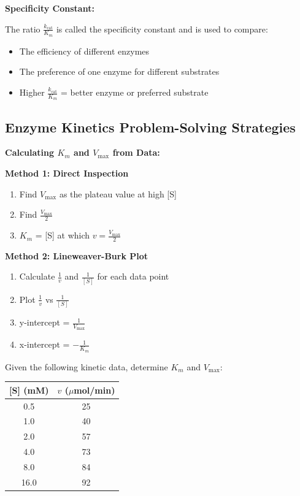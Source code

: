 \begin{theorem}
\textbf{Specificity Constant:}

The ratio $\frac{k_{\text{cat}}}{K_m}$ is called the specificity constant and is used to compare:
\begin{itemize}
    \item The efficiency of different enzymes
    \item The preference of one enzyme for different substrates
    \item Higher $\frac{k_{\text{cat}}}{K_m}$ = better enzyme or preferred substrate
\end{itemize}
\end{theorem}

\subsection{Enzyme Kinetics Problem-Solving Strategies}

\begin{skillbox}
\textbf{Calculating $K_m$ and $V_{\max}$ from Data:}

\textbf{Method 1: Direct Inspection}
\begin{enumerate}
    \item Find $V_{\max}$ as the plateau value at high [S]
    \item Find $\frac{V_{\max}}{2}$
    \item $K_m$ = [S] at which $v = \frac{V_{\max}}{2}$
\end{enumerate}

\textbf{Method 2: Lineweaver-Burk Plot}
\begin{enumerate}
    \item Calculate $\frac{1}{v}$ and $\frac{1}{[S]}$ for each data point
    \item Plot $\frac{1}{v}$ vs $\frac{1}{[S]}$
    \item y-intercept = $\frac{1}{V_{\max}}$
    \item x-intercept = $-\frac{1}{K_m}$
\end{enumerate}
\end{skillbox}

\begin{example}
Given the following kinetic data, determine $K_m$ and $V_{\max}$:

\begin{center}
\begin{tabular}{cc}
\toprule
{[S] (mM)} & $v$ ($\mu$mol/min) \\
\midrule
0.5 & 25 \\
1.0 & 40 \\
2.0 & 57 \\
4.0 & 73 \\
8.0 & 84 \\
16.0 & 92 \\
\bottomrule
\end{tabular}
\end{center}
\end{example}

